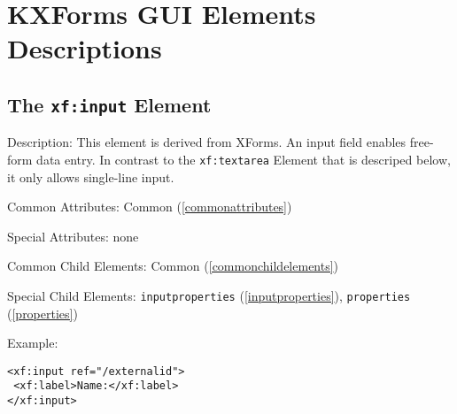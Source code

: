 
\section{ KXForms GUI Elements Descriptions}
\label{guielements}

\subsection{ The \texttt{xf:input} Element}
\begin{description}
 \item Description: This element is derived from XForms. An input field enables free-form data entry. In contrast to the \texttt{xf:textarea} Element that is descriped below, it only allows single-line input.

 \item Common Attributes: Common (\ref{commonattributes})

 \item Special Attributes: none

 \item Common Child Elements: Common (\ref{commonchildelements})

 \item Special Child Elements: \texttt{inputproperties} (\ref{inputproperties}), \texttt{properties} (\ref{properties})

 \item Example: 

\begin{lstlisting}[caption=\texttt{xf:input} Element]
<xf:input ref="/externalid">
 <xf:label>Name:</xf:label>
</xf:input>
\end{lstlisting}
\end{description}










